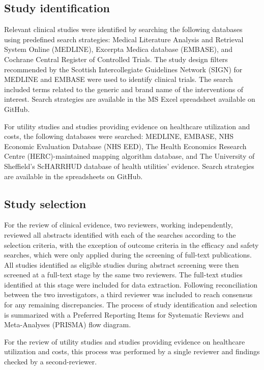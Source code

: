 \documentclass[11pt,final,fleqn]{article}\usepackage[]{graphicx}\usepackage[]{color}
\theoremstyle{plain}
\begin{document}
\begin{appendices}
\FloatBarrier

\subsection{Study identification}
Relevant clinical studies were identified by searching the following databases using predefined search strategies: Medical Literature Analysis and Retrieval System Online (MEDLINE), Excerpta Medica database (EMBASE), and Cochrane Central Register of Controlled Trials. The study design filters recommended by the Scottish Intercollegiate Guidelines Network (SIGN) for MEDLINE and EMBASE were used to identify clinical trials. The search included terms related to the generic and brand name of the interventions of interest. Search strategies are available in the MS Excel spreadsheet available on GitHub.

For utility studies and studies providing evidence on healthcare utilization and costs, the following databases were searched: MEDLINE, EMBASE, NHS Economic Evaluation Database (NHS EED), The Health Economics Research Centre (HERC)-maintained mapping algorithm database, and The University of Sheffield's ScHARRHUD database of health utilities' evidence. Search strategies are available in the spreadsheets on GitHub.

\subsection{Study selection}
For the review of clinical evidence, two reviewers, working independently, reviewed all abstracts identified with each of the searches according to the selection criteria, with the exception of outcome criteria in the efficacy and safety searches, which were only applied during the screening of full-text publications. All studies identified as eligible studies during abstract screening were then screened at a full-text stage by the same two reviewers. The full-text studies identified at this stage were included for data extraction. Following reconciliation between the two investigators, a third reviewer was included to reach consensus for any remaining discrepancies. The process of study identification and selection is summarized with a Preferred Reporting Items for Systematic Reviews and Meta-Analyses (PRISMA) flow diagram. 

For the review of utility studies and studies providing evidence on healthcare utilization and costs, this process was performed by a single reviewer and findings checked by a second-reviewer. 


\end{appendices}
\end{document}
